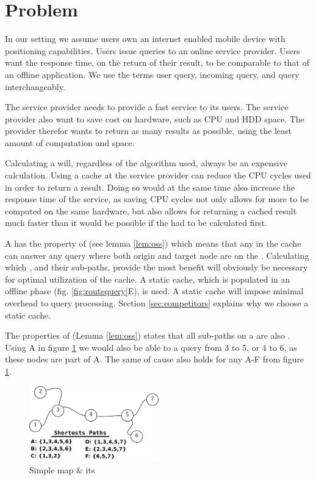 \section{Problem}\label{sec:problem}

In our setting we assume users own an internet enabled mobile device with positioning capabilities. Users issue \spath queries to an online service provider. Users want the response time, on the return of their \spath result, to be comparable to that of an offline application. We use the terms user query, incoming query, and query interchangeably.

The \spath service provider needs to provide a fast service to its users. The service provider also want to save cost on hardware, such as CPU and HDD space. The \spath provider therefor wants to return as many \spath results as possible, using the least amount of computation and space.

Calculating a \spath will, regardless of the algorithm used, always be an expensive calculation\cite{CNeed}. Using a \spath cache at the \spath service provider can reduce the CPU cycles used in order to return a \spath result. Doing so would at the same time also increase the response time of the \spath service, as saving CPU cycles not only allows for more \spaths to be computed on the same hardware, but also allows for returning a cached result much faster than it would be possible if the \spath had to be calculated first.

A \spath has the property of \oss (see lemma \ref{lem:oss}) which means that any \spath in the cache can answer any \spath query where both origin and target node are on the \spathns. Calculating which \spathsns, and their sub-paths, provide the most benefit will obviously be necessary for optimal utilization of the cache. A static cache, which is populated in an offline phase (fig. \ref{fig:routequery}E), is used. A static cache will impose minimal overhead to query processing. Section \ref{sec:competitors} explains why we choose a static cache.

The properties of \ossns (Lemma \ref{lem:oss}) states that all sub-paths on a \spath are also \spathsns. Using \spath A in figure \ref{fig:rxmap} we would also be able to a query from 3 to 5, or 4 to 6, as these nodes are part of \spath A. The same of cause also holds for any \spath A-F from figure \ref{fig:rxmap}.

\begin{figure}[hbt]
  \center
        \includegraphics[width=0.5\textwidth]{figures/rxmap}
        \caption{Simple map \& its \spaths}
  \label{fig:rxmap}
\end{figure}


